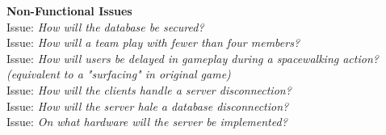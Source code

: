 \textbf{Non-Functional Issues}
\\
Issue: \textit{How will the database be secured?}
\\

Issue: \textit{How will a team play with fewer than four members?}
\\

Issue: \textit{How will users be delayed in gameplay during a spacewalking action? (equivalent to a "surfacing" in original game)}
\\

Issue: \textit{How will the clients handle a server disconnection?}
\\

Issue: \textit{How will the server hale a database disconnection?}
\\

Issue: \textit{On what hardware will the server be implemented?}
\\
